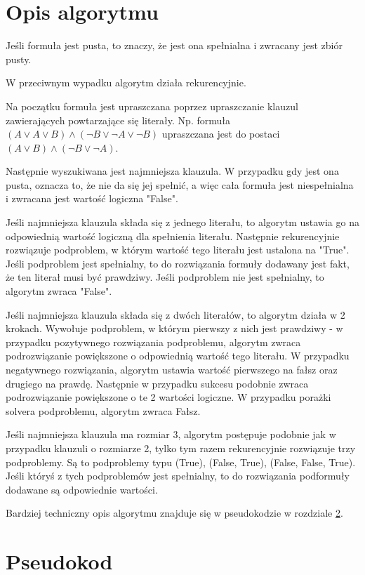 \documentclass[a4paper,10pt,twoside]{report}
\theoremstyle{definition}
\begin{document}
\section{Opis algorytmu}\label{sec:algorytm}

Jeśli formuła jest pusta, to znaczy, że jest ona spełnialna i zwracany jest zbiór pusty.

W przeciwnym wypadku algorytm działa rekurencyjnie.

Na początku formuła jest upraszczana poprzez upraszczanie klauzul zawierających powtarzające się literały. Np. formuła $(A \lor A \lor B) \land (\lnot B \lor \lnot A \lor \lnot B)$ upraszczana jest do postaci $(A \lor B) \land (\lnot B \lor \lnot A)$.

Następnie wyszukiwana jest najmniejsza klauzula. W przypadku gdy jest ona pusta, oznacza to, że nie da się jej spełnić, a więc cała formuła jest niespełnialna i zwracana jest wartość logiczna "False".

Jeśli najmniejsza klauzula składa się z jednego literału, to algorytm ustawia go na odpowiednią wartość logiczną dla spełnienia literału. Następnie rekurencyjnie rozwiązuje podproblem, w którym wartość tego literału jest ustalona na "True". Jeśli podproblem jest spełnialny, to do rozwiązania formuły dodawany jest fakt, że ten literał musi być prawdziwy. Jeśli podproblem nie jest spełnialny, to algorytm zwraca "False".

Jeśli najmniejsza klauzula składa się z dwóch literałów, to algorytm działa w 2 krokach. Wywołuje podproblem, w którym pierwszy z nich jest prawdziwy - w przypadku pozytywnego rozwiązania podproblemu, algorytm zwraca podrozwiązanie powiększone o odpowiednią wartość tego literału. W przypadku negatywnego rozwiązania, algorytm ustawia wartość pierwszego na fałsz oraz drugiego na prawdę. Następnie w przypadku sukcesu podobnie zwraca podrozwiązanie powiększone o te 2 wartości logiczne. W przypadku porażki solvera podproblemu, algorytm zwraca Fałsz.

Jeśli najmniejsza klauzula ma rozmiar 3, algorytm postępuje podobnie jak w przypadku klauzuli o rozmiarze 2, tylko tym razem rekurencyjnie rozwiązuje trzy podproblemy. Są to podproblemy typu (True), (False, True), (False, False, True). Jeśli któryś z tych podproblemów jest spełnialny, to do rozwiązania podformuły dodawane są odpowiednie wartości.

Bardziej techniczny opis algorytmu znajduje się w pseudokodzie w rozdziale \ref{sec:pseudokod}.

\section{Pseudokod}
\label{sec:pseudokod}
\end{document}
